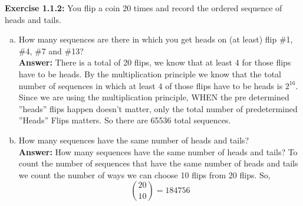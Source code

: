 \documentclass{amsart}
\begin{document}
\noindent\textbf{Exercise 1.1.2: } You flip a coin 20 times and record the ordered sequence of heads and tails.
\begin{enumerate}[(a)]
\item How many sequences are there in which you get heads on (at least) flip \#1, \#4, \#7 and \#13?\\

\noindent \textbf{Answer:}
There is a total of 20 flips, we know that at least 4 for those flips have to be heads. By the multiplication principle we know that the total number of sequences in which at least 4 of those flips have to be heads is $2^16$. Since we are using the multiplication principle, WHEN the pre determined ”heads” flips happen doesn’t matter, only the total number of predetermined ”Heads” Flips matters. So there are 65536 total sequences.
\vspace{1in}

\item How many sequences have the same number of heads and tails?\\

\noindent \textbf{Answer:}
How many sequences have the same number of heads and tails?
To count the number of sequences that have the same number of heads and tails we count the number of ways we can choose 10 flips from 20 flips. So,
\begin{equation}
{20\choose10} = 184756
\end{equation}




\vspace{1in}
\end{enumerate}
\end{document}
